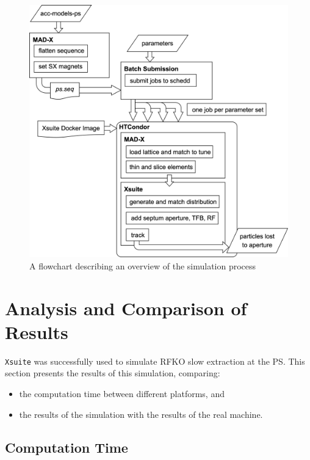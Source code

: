 \documentclass[11pt]{report}
\begin{document}
\begin{figure}[h]
  \centering
  \includegraphics*[width=\linewidth]{simulation-flowchart.png}
  \caption{A flowchart describing an overview of the simulation process}\label{fig:flowchart}
\end{figure}

\chapter{Analysis and Comparison of Results}

\verb|Xsuite| was successfully used to simulate RFKO slow extraction at the PS. This section presents the results of this simulation, comparing:
\begin{itemize}
  \item the computation time between different platforms, and
  \item the results of the simulation with the results of the real machine.
\end{itemize}


\section{Computation Time}
\end{document}
